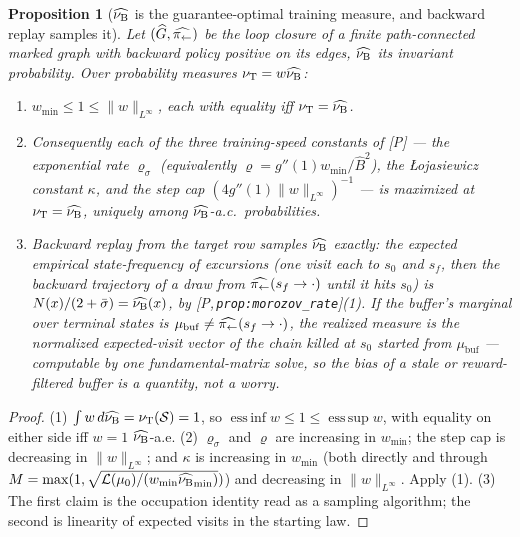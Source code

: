 \documentclass[11pt]{article}
\newtheorem{proposition}[theorem]{Proposition}
\theoremstyle{definition}
\theoremstyle{remark}
\def\lambda{\widehat\nuB}
\newcommand{\paperref}[1]{[P,\,\texttt{#1}]}   %
\begin{document}
\begin{proposition}[$\lambda$ is the guarantee-optimal training measure, and backward
replay samples it]\label{prop:backward_replay_notes}
Let $(\widehat G,\widehat{\pi_{\leftarrow}})$ be the loop closure of a finite path-connected
marked graph with backward policy positive on its edges, $\lambda$ its invariant
probability. Over probability measures $\nutrain=w\lambda$:
\begin{enumerate}
    \item $w_{\min}\leq1\leq\|w\|_{L^\infty}$, each with equality iff $\nutrain=\lambda$.
    \item Consequently each of the three training-speed constants of [P] --- the
    exponential rate $\varrho_\sigma$ (equivalently $\varrho=g''(1)w_{\min}/\widehat B^2$),
    the \L ojasiewicz constant $\kappa$, and the step cap
    $(4g''(1)\|w\|_{L^\infty})^{-1}$ --- is maximized at $\nutrain=\lambda$, uniquely
    among $\lambda$-a.c.\ probabilities.
    \item Backward replay from the target row samples $\lambda$ \emph{exactly}: the
    expected empirical state-frequency of excursions (one visit each to $s_0$ and $s_f$,
    then the backward trajectory of a draw from
    $\widehat{\pi_{\leftarrow}}(s_f\rightarrow\cdot)$ until it hits $s_0$) is
    $N(x)/(2+\bar\sigma)=\lambda(x)$, by \paperref{prop:morozov\_rate}(1). If the buffer's
    marginal over terminal states is $\mu_{\mathrm{buf}}\neq\widehat{\pi_{\leftarrow}}(s_f\rightarrow\cdot)$,
    the realized measure is the normalized expected-visit vector of the chain killed at
    $s_0$ started from $\mu_{\mathrm{buf}}$ --- computable by one fundamental-matrix
    solve, so the bias of a stale or reward-filtered buffer is a quantity, not a worry.
\end{enumerate}
\end{proposition}

\begin{proof}
(1) $\int w\,d\lambda=\nutrain(\Statespace)=1$, so $\operatorname*{ess\,inf}w\leq1\leq
\operatorname*{ess\,sup}w$, with equality on either side iff $w=1$ $\lambda$-a.e.
(2) $\varrho_\sigma$ and $\varrho$ are increasing in $w_{\min}$; the step cap is
decreasing in $\|w\|_{L^\infty}$; and $\kappa$ is increasing in $w_{\min}$ (both directly
and through $M=\max(1,\sqrt{\mathcal L(\mu_0)/(w_{\min}\lambda_{\min})})$) and decreasing
in $\|w\|_{L^\infty}$. Apply (1).
(3) The first claim is the occupation identity read as a sampling algorithm; the second
is linearity of expected visits in the starting law.
\end{proof}
\end{document}
